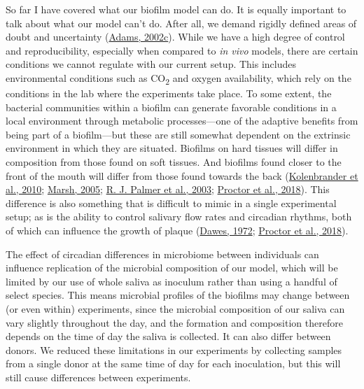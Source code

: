\documentclass[
  letterpaper,
]{book}
\begin{document}
So far I have covered what our biofilm model can do. It is equally
important to talk about what our model can't do. After all, we demand
rigidly defined areas of doubt and uncertainty
(\protect\hyperlink{ref-adamsHitchhikersGuide2002}{Adams, 2002c}). While
we have a high degree of control and reproducibility, especially when
compared to \emph{in vivo} models, there are certain conditions we
cannot regulate with our current setup. This includes environmental
conditions such as CO\textsubscript{2} and oxygen availability, which
rely on the conditions in the lab where the experiments take place. To
some extent, the bacterial communities within a biofilm can generate
favorable conditions in a local environment through metabolic
processes---one of the adaptive benefits from being part of a
biofilm---but these are still somewhat dependent on the extrinsic
environment in which they are situated. Biofilms on hard tissues will
differ in composition from those found on soft tissues. And biofilms
found closer to the front of the mouth will differ from those found
towards the back
(\protect\hyperlink{ref-kolenbranderOralMultispecies2010}{Kolenbrander
et al., 2010}; \protect\hyperlink{ref-marshDentalPlaque2005}{Marsh,
2005}; \protect\hyperlink{ref-palmerCoaggregationInteractions2003}{R. J.
Palmer et al., 2003};
\protect\hyperlink{ref-proctorSpatialGradient2018}{Proctor et al.,
2018}). This difference is also something that is difficult to mimic in
a single experimental setup; as is the ability to control salivary flow
rates and circadian rhythms, both of which can influence the growth of
plaque (\protect\hyperlink{ref-dawesCircadianRhythms1972}{Dawes, 1972};
\protect\hyperlink{ref-proctorSpatialGradient2018}{Proctor et al.,
2018}).

The effect of circadian differences in microbiome between individuals
can influence replication of the microbial composition of our model,
which will be limited by our use of whole saliva as inoculum rather than
using a handful of select species. This means microbial profiles of the
biofilms may change between (or even within) experiments, since the
microbial composition of our saliva can vary slightly throughout the
day, and the formation and composition therefore depends on the time of
day the saliva is collected. It can also differ between donors. We
reduced these limitations in our experiments by collecting samples from
a single donor at the same time of day for each inoculation, but this
will still cause differences between experiments.
\end{document}
